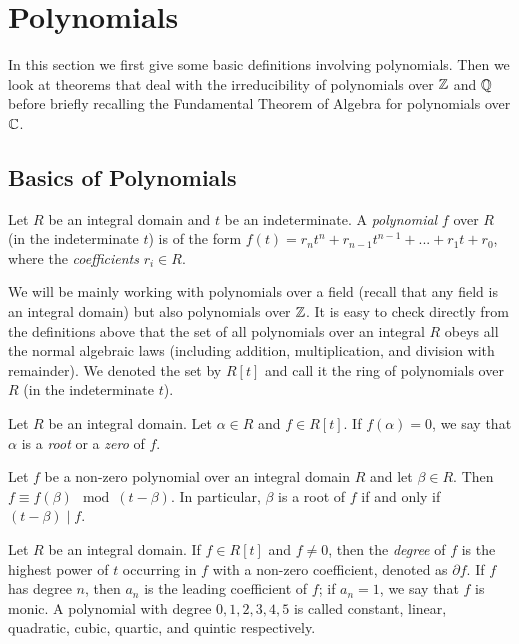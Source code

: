 

\section{Polynomials}
In this section we first give some basic definitions involving polynomials. Then we look at theorems that deal with the irreducibility of polynomials over $\mathbb Z$ and $\mathbb Q$ before briefly recalling the Fundamental Theorem of Algebra for polynomials over $\mathbb C$. 
\subsection{Basics of Polynomials}

\begin{definition}
    Let $R$ be an integral domain and $t$ be an indeterminate. A \textit{polynomial} $f$ over $R$ (in the indeterminate $t$) is of the form $f(t) = r_n t^n + r_{n-1} t^{n-1} + ... + r_1 t + r_0$, where the \textit{coefficients} $r_i \in R$. 
\end{definition}

We will be mainly working with polynomials over a field (recall that any field is an integral domain) but also polynomials over $\mathbb Z$. It is easy to check directly from the definitions above that the set of all polynomials over an integral $R$ obeys all the normal algebraic laws (including addition, multiplication, and division with remainder). We denoted the set by $R[t]$ and call it the ring of polynomials over $R$ (in the indeterminate $t$). 

\begin{definition}
	Let $R$ be an integral domain. Let $\alpha \in R$ and $f \in R[t]$. If $f(\alpha) = 0$, we say that $\alpha$ is a \textit{root} or a \textit{zero} of $f$. 
\end{definition}

\begin{theorem} \label{thm:remainder}
	Let $f$ be a non-zero polynomial over an integral domain $R$ and let $\beta \in R$. Then $f \equiv f(\beta) \mod (t - \beta)$. 
	In particular, $\beta$ is a root of $f$ if and only if $(t - \beta) \mid f$. 
\end{theorem}


\begin{definition}
	Let $R$ be an integral domain. If $f \in R[t]$ and $f \neq 0$, then the \textit{degree} of $f$ is the highest power of $t$ occurring in $f$ with a non-zero coefficient, denoted as $\partial f$. If $f$ has degree $n$, then $a_n$ is the leading coefficient of $f$; if $a_n = 1$, we say that $f$ is monic. A polynomial with degree $0, 1, 2, 3, 4, 5$ is called constant, linear, quadratic, cubic, quartic, and quintic respectively.
\end{definition}



